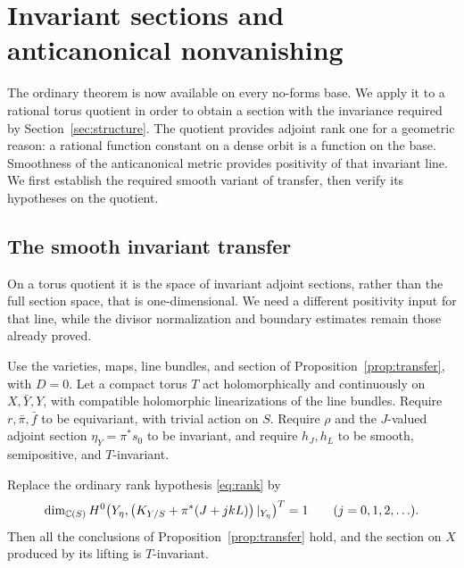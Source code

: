\section{Invariant sections and anticanonical nonvanishing}
\label{sec:torus}

The ordinary theorem is now available on every no-forms base. We apply
it to a rational torus quotient in order to obtain a section with the
invariance required by Section~\ref{sec:structure}. The quotient
provides adjoint rank one for a geometric reason: a rational function
constant on a dense orbit is a function on the base. Smoothness of the
anticanonical metric provides positivity of that invariant line.
We first establish the required smooth variant of transfer, then
verify its hypotheses on the quotient.

\subsection{The smooth invariant transfer}
\label{sec:invariant-transfer}

On a torus quotient it is the space of invariant adjoint sections,
rather than the full section space, that is one-dimensional.
We need a different positivity input for that line, while the divisor
normalization and boundary estimates remain those already proved.

\begin{proposition}\label{prop:invariant-transfer}
Use the varieties, maps, line bundles, and section of
Proposition~\ref{prop:transfer}, with \(D=0\).
Let a compact torus \(T\) act holomorphically and continuously on
\(X,\bar Y,Y\), with compatible holomorphic linearizations of the
line bundles. Require \(r,\bar\pi,\bar f\) to be equivariant, with
trivial action on \(S\). Require \(\rho\) and the \(J\)-valued adjoint
section \(\eta_Y=\pi^*s_0\) to be invariant, and require \(h_J,h_L\)
to be smooth, semipositive, and \(T\)-invariant.

Replace the ordinary rank hypothesis \eqref{eq:rank} by
\[
 \dim_{\mathbb C(S)}
 H^0\!\left(Y_\eta,
 \left(K_{Y/S}+\pi^*(J+jkL)\right)|_{Y_\eta}\right)^T=1
 \qquad(j=0,1,2,\ldots).
\]
Then all the conclusions of Proposition~\ref{prop:transfer} hold,
and the section on \(X\) produced by its lifting is \(T\)-invariant.
\end{proposition}


